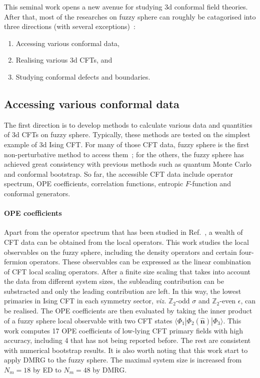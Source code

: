 \documentclass{timesjhep}
\begin{document}
This seminal work opens a new avenue for studying 3d conformal field theories. After that, most of the researches on fuzzy sphere can roughly be catagorised into three directions (with several exceptions)~: 

\begin{enumerate} 
    \item Accessing various conformal data, 
    \item Realising various 3d CFTs, and 
    \item Studying conformal defects and boundaries.
\end{enumerate} 

\subsection{Accessing various conformal data}

The first direction is to develop methods to calculate various data and quantities of 3d CFTs on fuzzy sphere. Typically, these methods are tested on the simplest example of 3d Ising CFT. For many of those CFT data, fuzzy sphere is the first non-perturbative method to access them~; for the others, the fuzzy sphere has achieved great consistency with previous methods such as quantum Monte Carlo and conformal bootstrap. So far, the accessible CFT data include operator spectrum, OPE coefficients, correlation functions, entropic $F$-function and conformal generators. 

\paragraph{OPE coefficients~\cite{Hu2023Mar}}

Apart from the operator spectrum that has been studied in Ref.~\cite{}, a wealth of CFT data can be obtained from the local operators. This work studies the local observables on the fuzzy sphere, including the density operators and certain four-fermion operators. These observables can be expressed as the linear combination of CFT local scaling operators. After a finite size scaling that takes into account the data from different system sizes, the subleading contribution can be substracted and only the leading contribution are left. In this way, the lowest primaries in Ising CFT in each symmetry sector, \textit{viz.} $\mathbb{Z}_2$-odd $\sigma$ and $\mathbb{Z}_2$-even $\epsilon$, can be realised. The OPE coefficients are then evaluated by taking the inner product of a fuzzy sphere local observable with two CFT states $\langle\Phi_1|\Phi_2(\hat{\mathbf{n}})|\Phi_3\rangle$. This work computes 17 OPE coefficients of low-lying CFT primary fields with high accuracy, including 4 that has not being reported before. The rest are consistent with numerical bootstrap results. It is also worth noting that this work start to apply DMRG to the fuzzy sphere. The maximal system size is increased from $N_m=18$ by ED to $N_m=48$ by DMRG. 
\end{document}

